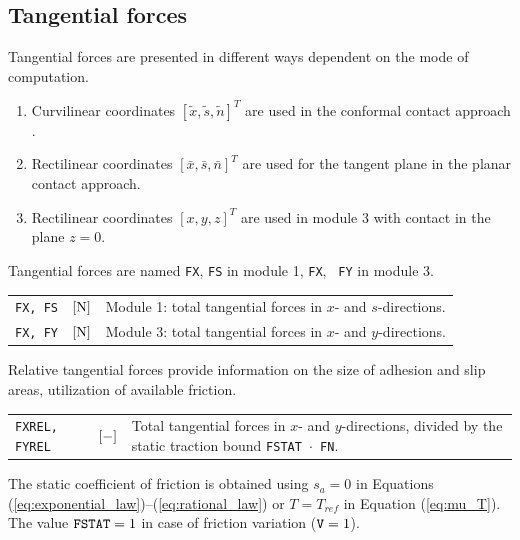 \documentclass[12pt]{report}
\newenvironment{inputvars}{\vspace{0.4\baselineskip}%

\begin{tabular}{>{\raggedright}p{22mm}p{19mm}p{113mm}}}{
\end{tabular}

}
\newcommand{\inpvar}[3]{{\small\tt #1} & $#2$ & #3 \\[1ex]}
\begin{document}
\subsection{Tangential forces}

Tangential forces are presented in different ways dependent on the mode of
computation.
\begin{enumerate}
\item Curvilinear coordinates $[\tilde{x},\tilde{s},\tilde{n}]^T$ are used
        in the conformal contact approach \cite{Vollebregt2020c-distr-force}.
\item Rectilinear coordinates $[\bar{x},\bar{s},\bar{n}]^T$ are used for
        the tangent plane in the planar contact approach.
\item Rectilinear coordinates $[x,y,z]^T$ are used in module 3 with contact
        in the plane $z=0$.
\end{enumerate}
Tangential forces are named {\tt FX}, {\tt FS} in module 1, {\tt FX}, {\tt
FY} in module 3. 
\begin{inputvars}
\inpvar{FX, FS}{\bunit{N}}{Module 1: total tangential forces in $x$- and
        $s$-directions.}
\inpvar{FX, FY}{\bunit{N}}{Module 3: total tangential forces in $x$- and
        $y$-directions.}
\end{inputvars}
Relative tangential forces provide information on the size of adhesion and
slip areas, utilization of available friction.
\begin{inputvars}
\inpvar{FXREL, FYREL}{\bunit{-}}{Total tangential forces in $x$- and
        $y$-directions, divided by the static traction bound {\tt FSTAT
        $\cdot$ FN}.}
\end{inputvars}
The static coefficient of friction is obtained using $s_a=0$ in Equations
(\ref{eq:exponential_law})--(\ref{eq:rational_law}) or $T=T_{ref}$ in
Equation (\ref{eq:mu_T}). The value ${\tt FSTAT}=1$ in case of friction
variation (${\tt V}=1$).
\end{document}
